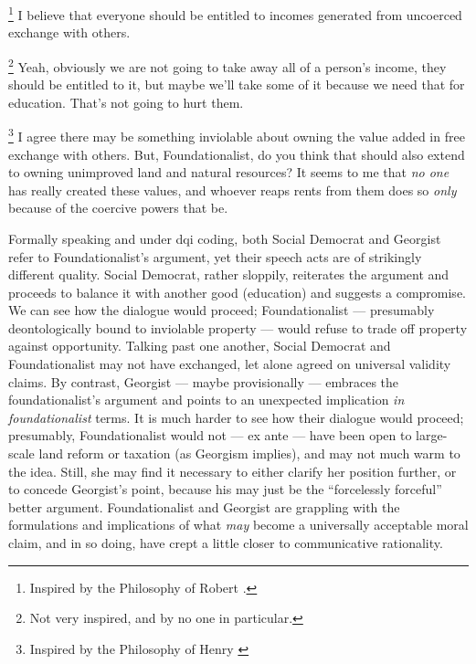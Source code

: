 \begin{dialogue}
	\footnote{
		Inspired by the Philosophy of Robert \cite{Nozick1974}.
	}
	I believe that everyone should be entitled to incomes generated from uncoerced exchange with others.

	\footnote{
		Not very inspired, and by no one in particular.
	}
	Yeah, obviously we are not going to take away all of a person's income, they should be entitled to it, but maybe we'll take some of it because we need that for education.
	That's not going to hurt them.

	\footnote{
		Inspired by the Philosophy of Henry \cite{George1879}
	}
	I agree there may be something inviolable about owning the value added in free exchange with others.
	But, Foundationalist, do you think that should also extend to owning unimproved land and natural resources?
	It seems to me that \emph{no one} has really created these values, and whoever reaps rents from them does so \emph{only} because of the coercive powers that be.
\end{dialogue}

Formally speaking and under \gls{dqi} coding, both Social Democrat and Georgist refer to Foundationalist's argument, yet their speech acts are of strikingly different quality.
Social Democrat, rather sloppily, reiterates the argument and proceeds to balance it with another good (education) and suggests a compromise.
We can see how the dialogue would proceed;
Foundationalist --- presumably deontologically bound to inviolable property --- would refuse to trade off property against opportunity.
Talking past one another, Social Democrat and Foundationalist may not have exchanged, let alone agreed on universal validity claims.
By contrast, Georgist --- maybe provisionally --- embraces the foundationalist's argument and points to an unexpected implication \emph{in foundationalist} terms.
It is much harder to see how their dialogue would proceed;
presumably, Foundationalist would not --- ex ante --- have been open to large-scale land reform or taxation (as Georgism implies), and may not much warm to the idea.
Still, she may find it necessary to either clarify her position further, or to concede Georgist's point, because his may just be the ``forcelessly forceful'' better argument.
Foundationalist and Georgist are grappling with the formulations and implications of what \emph{may} become a universally acceptable moral claim, and in so doing, have crept a little closer to communicative rationality.

